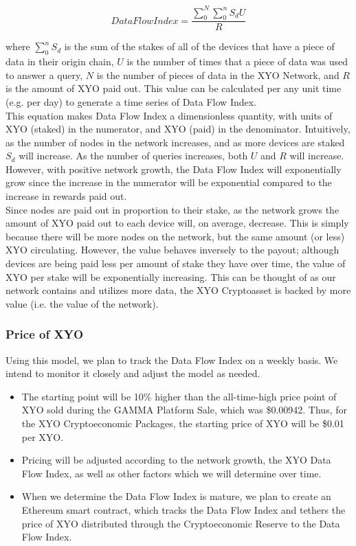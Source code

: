 \documentclass{article}
\begin{document}
\begin{equation}
Data Flow Index = \frac{\sum_{0}^{N}\sum_{0}^{n}S_dU}{R}
\end{equation}

where $\sum^{n}_{0}{S_d}$ is the sum of the stakes of all of the devices that have a piece of data in their origin chain, $U$ is the number of times that a piece of data was used to answer a query, $N$ is the number of pieces of data in the XYO Network, and $R$ is the amount of XYO paid out. This value can be calculated per any unit time (e.g. per day) to generate a time series of Data Flow Index. \\
This equation makes Data Flow Index a dimensionless quantity, with units of XYO (staked) in the numerator, and XYO (paid) in the denominator. Intuitively, as the number of nodes in the network increases, and as more devices are staked $S_d$ will increase. As the number of queries increases, both $U$ and $R$ will increase. However, with positive network growth, the Data Flow Index will exponentially grow since the increase in the numerator will be exponential compared to the increase in rewards paid out.\\
Since nodes are paid out in proportion to their stake, as the network grows the amount of XYO paid out to each device will, on average, decrease. This is simply because there will be more nodes on the network, but the same amount (or less) XYO circulating. However, the value behaves inversely to the payout; although devices are being paid less per amount of stake they have over time, the value of XYO per stake will be exponentially increasing. This can be thought of as our network contains and utilizes more data, the XYO Cryptoasset is backed by more value (i.e. the value of the network).

\subsubsection{Price of XYO}

Using this model, we plan to track the Data Flow Index on a weekly basis. We intend to monitor it closely and adjust the model as needed.

\begin{itemize}
  \item The starting point will be 10\% higher than the all-time-high price point of XYO sold during the GAMMA Platform Sale, which was \$0.00942. Thus, for the XYO Cryptoeconomic Packages, the starting price of XYO will be \$0.01 per XYO.
  \item Pricing will be adjusted according to the network growth, the XYO Data Flow Index, as well as other factors which we will determine over time.
  \item When we determine the Data Flow Index is mature, we plan to create an Ethereum smart contract, which tracks the Data Flow Index and tethers the price of XYO distributed through the Cryptoeconomic Reserve to the Data Flow Index.
\end{itemize}
\end{document}
